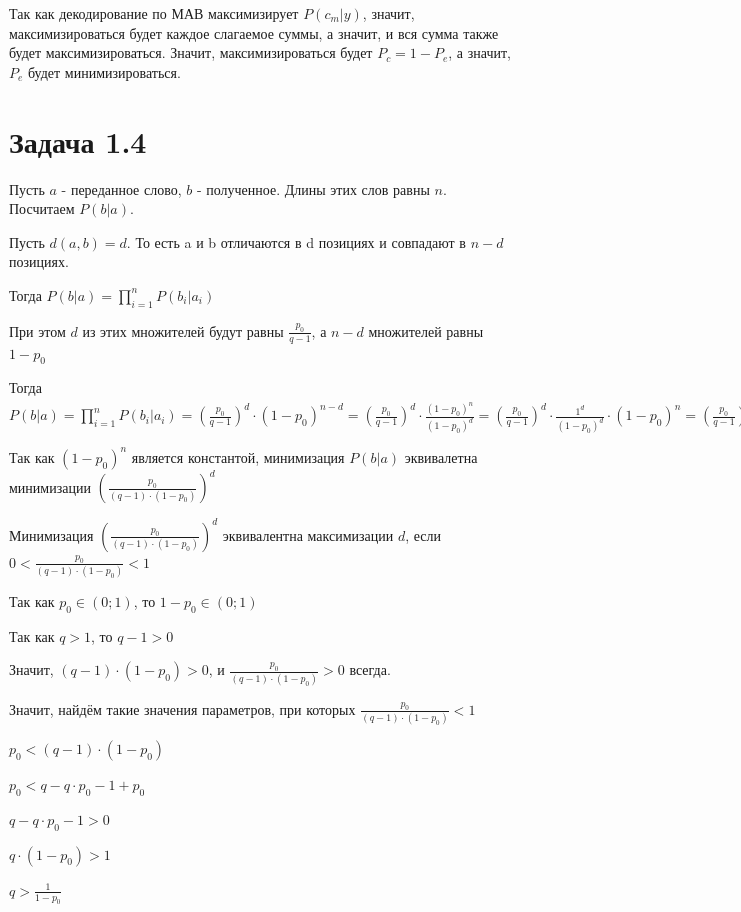 \documentclass{article}
\begin{document}
	 Так как декодирование по МАВ максимизирует $P(c_m|y)$, значит, максимизироваться будет каждое слагаемое суммы, а значит, и вся сумма также будет максимизироваться. Значит, максимизироваться будет $P_c = 1 - P_e$, а значит, $P_e$ будет минимизироваться.
	 
	 \section{Задача 1.4}
	 
	 Пусть $a$ - переданное слово, $b$ - полученное. Длины этих слов равны $n$.
	 Посчитаем $P(b|a)$. 
	 
	 Пусть $d(a, b) = d$. То есть a и b отличаются в d позициях и совпадают в $n - d$ позициях.
	 
	 Тогда $P(b|a) = \prod\limits_{i = 1}^n P(b_i|a_i)$
	 
	 При этом $d$ из этих множителей будут равны $\frac{p_0}{q - 1}$, а $n - d$ множителей равны $1 - p_0$
	 
	 Тогда $P(b|a) = \prod\limits_{i = 1}^n P(b_i|a_i) = (\frac{p_0}{q - 1})^d \cdot (1 - p_0)^{n - d} = (\frac{p_0}{q - 1})^d \cdot \frac{(1 - p_0)^n}{(1 - p_0)^d} = (\frac{p_0}{q - 1})^d \cdot \frac{1^d}{(1 - p_0)^d} \cdot (1 - p_0)^n =(\frac{p_0}{q - 1})^d \cdot (\frac{1}{1 - p_0})^d \cdot (1 - p_0)^n = (\frac{p_0}{(q - 1) \cdot (1 - p_0)})^d \cdot (1 - p_0)^n $
	 
	 Так как $(1 - p_0)^n$ является константой, минимизация $P(b|a)$ эквивалетна минимизации $(\frac{p_0}{(q - 1) \cdot (1 - p_0)})^d$ 
	 
	 Минимизация $(\frac{p_0}{(q - 1) \cdot (1 - p_0)})^d$ эквивалентна максимизации $d$, если $0 < \frac{p_0}{(q - 1) \cdot (1 - p_0)} < 1$
	 
	 Так как $p_0 \in (0; 1)$, то $1 - p_0 \in (0; 1)$
	 
	 Так как $q > 1$, то $q - 1 > 0$
	 
	 Значит, $(q - 1) \cdot (1 - p_0) > 0$, и $\frac{p_0}{(q - 1) \cdot (1 - p_0)} > 0$ всегда. 
	 
	 Значит, найдём такие значения параметров, при которых $\frac{p_0}{(q - 1) \cdot (1 - p_0)} < 1$
	 
	 $p_0 < (q - 1) \cdot (1 - p_0)$
	 
	  $p_0 < q - q \cdot p_0 - 1 + p_0$
	  
	  $q - q \cdot p_0 - 1 > 0$
	  
	  $q \cdot (1 - p_0) > 1$
	  
	  $q > \frac{1}{1 - p_0}$
	  
\end{document}
